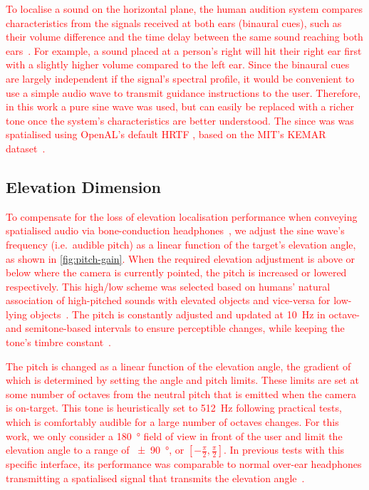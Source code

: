 \documentclass[acmsmall]{acmart}
\newcommand\hl[1]{\textcolor{red}{#1}}
\begin{document}
\hl{To localise a sound on the horizontal plane, the human audition system compares characteristics from the signals received at both ears (binaural cues), such as their volume difference and the time delay between the same sound reaching both ears~\citep{blauert1969sound}.
For example, a sound placed at a person's right will hit their right ear first with a slightly higher volume compared to the left ear.
Since the binaural cues are largely independent if the signal's spectral profile, it would be convenient to use a simple audio wave to transmit guidance instructions to the user.
Therefore, in this work a pure sine wave was used, but can easily be replaced with a richer tone once the system's characteristics are better understood. 
The since was was spatialised using OpenAL's default HRTF , based on the MIT's KEMAR dataset~\citep{hiebert2005openal}.} %

\subsection{Elevation Dimension}

\hl{To compensate for the loss of elevation localisation performance when conveying spatialised audio via bone-conduction headphones~\citep{macdonald2006spatial,schonstein2008comparison}, we adjust the sine wave's frequency (i.e.\ audible pitch) as a linear function of the target's elevation angle, as shown in \cref{fig:pitch-gain}.
When the required elevation adjustment is above or below where the camera is currently pointed, the pitch is increased or lowered respectively. 
This high/low scheme was selected based on humans' natural association of high-pitched sounds with elevated objects and vice-versa for low-lying objects~\citep{pratt1930spatial,blauert1997spatial}.
The pitch is constantly adjusted and updated at \SI{10}{\hertz} in octave- and semitone-based intervals to ensure perceptible changes, while keeping the tone's timbre constant~\citep{shepard1964circularity}. }

\hl{The pitch is changed as a linear function of the elevation angle, the gradient of which is determined by setting the angle and pitch limits.
These limits are set at some number of octaves from the neutral pitch that is emitted when the camera is on-target. 
This tone is heuristically set to \SI{512}{\hertz} following practical tests, which is comfortably audible for a large number of octaves changes.
For this work, we only consider a \SI{180}{\degree} field of view in front of the user and limit the elevation angle to a range of \SI{\pm90}{\degree}, or $[-\frac{\pi}{2}, \frac{\pi}{2}]$.
In previous tests with this specific interface, its performance was comparable to normal over-ear headphones transmitting a spatialised signal that transmits the elevation angle~\citep{lock2019bone}.}
\end{document}
